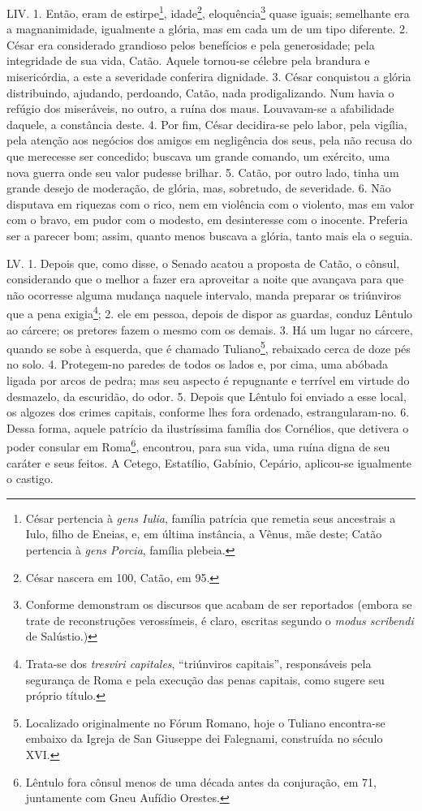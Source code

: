LIV. 1. Então, eram de estirpe\footnote{César pertencia à \emph{gens Iulia},
família patrícia que remetia seus ancestrais a Iulo, filho de Eneias, e, em
última instância, a Vênus, mãe deste; Catão pertencia à \emph{gens Porcia},
família plebeia.}, idade\footnote{César nascera em 100, Catão, em 95.},
eloquência\footnote{Conforme demonstram os discursos que acabam de ser
reportados (embora se trate de reconstruções verossímeis, é claro, escritas
segundo o \emph{modus scribendi} de Salústio.)} quase iguais; semelhante era a
magnanimidade, igualmente a glória, mas em cada um de um tipo diferente. 2.
César era considerado grandioso pelos benefícios e pela generosidade; pela
integridade de sua vida, Catão. Aquele tornou-se célebre pela brandura e
misericórdia, a este a severidade conferira dignidade. 3. César conquistou a
glória distribuindo, ajudando, perdoando, Catão, nada prodigalizando. Num havia
o refúgio dos miseráveis, no outro, a ruína dos maus. Louvavam-se a afabilidade
daquele, a constância deste. 4. Por fim, César decidira-se pelo labor, pela
vigília, pela atenção aos negócios dos amigos em negligência dos seus, pela não
recusa do que merecesse ser concedido; buscava um grande comando, um exército,
uma nova guerra onde seu valor pudesse brilhar. 5. Catão, por outro lado, tinha
um grande desejo de moderação, de glória, mas, sobretudo, de severidade. 6. Não
disputava em riquezas com o rico, nem em violência com o violento, mas em valor
com o bravo, em pudor com o modesto, em desinteresse com o inocente. Preferia
ser a parecer bom; assim, quanto menos buscava a glória, tanto mais ela o
seguia. 

LV. 1. Depois que, como disse, o Senado acatou a proposta de Catão, o cônsul,
considerando que o melhor a fazer era aproveitar a noite que avançava para que
não ocorresse alguma mudança naquele intervalo, manda preparar os triúnviros
que a pena exigia\footnote{Trata-se dos \emph{tresviri capitales}, ``triúnviros
capitais'', responsáveis pela segurança de Roma e pela execução das penas
capitais, como sugere seu próprio título.}; 2. ele em pessoa, depois de dispor
as guardas, conduz Lêntulo ao cárcere; os pretores fazem o mesmo com os demais.
3. Há um lugar no cárcere, quando se sobe à esquerda, que é chamado
Tuliano\footnote{Localizado originalmente no Fórum Romano, hoje o Tuliano
encontra-se embaixo da Igreja de San Giuseppe dei Falegnami, construída no
século XVI.}, rebaixado cerca de doze pés no solo. 4. Protegem-no paredes de
todos os lados e, por cima, uma abóbada ligada por arcos de pedra; mas seu
aspecto é repugnante e terrível em virtude do desmazelo, da escuridão, do odor.
5. Depois que Lêntulo foi enviado a esse local, os algozes dos crimes capitais,
conforme lhes fora ordenado, estrangularam-no. 6. Dessa forma, aquele patrício
da ilustríssima família dos Cornélios, que detivera o poder consular em
Roma\footnote{Lêntulo fora cônsul menos de uma década antes da conjuração, em
71, juntamente com Gneu Aufídio Orestes.}, encontrou, para sua vida, uma ruína
digna de seu caráter e seus feitos. A Cetego, Estatílio, Gabínio, Cepário,
aplicou-se igualmente o castigo.

